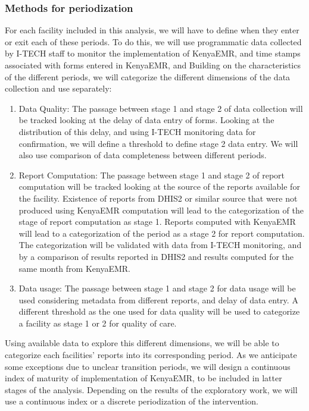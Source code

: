 \documentclass[a4paper,11pt,draft,twoside]{article}
\begin{document}

        \subsubsection{Methods for periodization}
For each facility included in this analysis, we will have to define when they enter or exit each of these periods. To do this, we will use programmatic data collected by I-TECH staff to monitor the implementation of KenyaEMR, and time stamps associated with forms entered in KenyaEMR, and Building on the characteristics of the different periods, we will categorize the different dimensions of the data collection and use separately:

\begin{enumerate}
\item    Data Quality: The passage between stage 1 and stage 2 of data collection will be tracked looking at the delay of data entry of forms. Looking at the distribution of this delay, and using I-TECH monitoring data for confirmation, we will define a threshold to define stage 2 data entry. We will also use comparison of data completeness between different periods.
\item	Report Computation: The passage between stage 1 and stage 2 of report computation will be tracked looking at the source of the reports available for the facility. Existence of reports from DHIS2 or similar source that were not produced using KenyaEMR computation will lead to the categorization of the stage of report computation as stage 1. Reports computed with KenyaEMR will lead to a categorization of the period as a stage 2 for report computation. The categorization will be validated with data from I-TECH monitoring, and by a comparison of results reported in DHIS2 and results computed for the same month from KenyaEMR.
\item	Data usage: The passage between stage 1 and stage 2 for data usage will be used considering metadata from different reports, and delay of data entry. A different threshold as the one used for data quality will be used to categorize a facility as stage 1 or 2 for quality of care.
\end{enumerate}

Using available data to explore this different dimensions, we will be able to categorize each facilities’ reports into its corresponding period. As we anticipate some exceptions due to unclear transition periods, we will design a continuous index of maturity of implementation of KenyaEMR, to be included in latter stages of the analysis. Depending on the results of the exploratory work, we will use a continuous index or a discrete periodization of the intervention.
\end{document}
